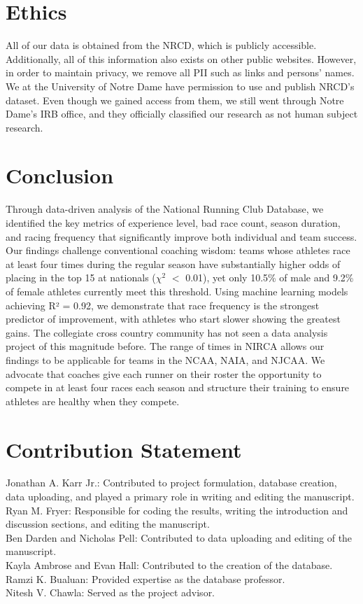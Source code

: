 \documentclass[suppldata]{interact}
\theoremstyle{plain}%
\theoremstyle{definition}
\theoremstyle{remark}
\begin{document}
\section{Ethics}
All of our data is obtained from the NRCD, which is publicly accessible. Additionally, all of this information also exists on other public websites. However, in order to maintain privacy, we remove all PII such as links and persons' names.
We at the University of Notre Dame have permission to use and publish NRCD's dataset. Even though we gained access from them, we still went through Notre Dame's IRB office, and they officially classified our research as not human subject research.

\section{Conclusion}
Through data-driven analysis of the National Running Club Database, we identified the key metrics of experience level, bad race count, season duration, and racing frequency that significantly improve both individual and team success. Our findings challenge conventional coaching wisdom: teams whose athletes race at least four times during the regular season have substantially higher odds of placing in the top 15 at nationals ($\chi^2$ $<$ 0.01), yet only 10.5\% of male and 9.2\% of female athletes currently meet this threshold. Using machine learning models achieving R² = 0.92, we demonstrate that race frequency is the strongest predictor of improvement, with athletes who start slower showing the greatest gains. The collegiate cross country community has not seen a data analysis project of this magnitude before. The range of times in NIRCA allows our findings to be applicable for teams in the NCAA, NAIA, and NJCAA. We advocate that coaches give each runner on their roster the opportunity to compete in at least four races each season and structure their training to ensure athletes are healthy when they compete. 

\section*{Contribution Statement}
Jonathan A. Karr Jr.: Contributed to project formulation, database creation, data uploading, and played a primary role in writing and editing the manuscript.\\
Ryan M. Fryer: Responsible for coding the results, writing the introduction and discussion sections, and editing the manuscript.\\
Ben Darden and Nicholas Pell: Contributed to data uploading and editing of the manuscript.\\
Kayla Ambrose and Evan Hall: Contributed to the creation of the database.\\
Ramzi K. Bualuan: Provided expertise as the database professor.\\
Nitesh V. Chawla: Served as the project advisor.
\end{document}
